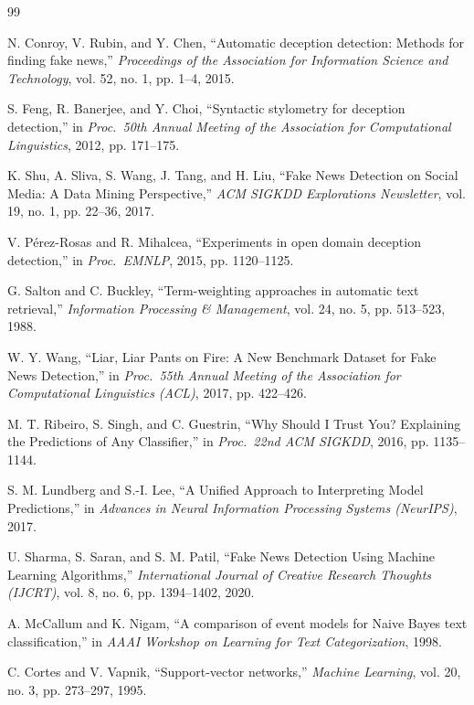 \documentclass[conference]{IEEEtran}
\begin{document}
\begin{thebibliography}{99}

 N. Conroy, V. Rubin, and Y. Chen, ``Automatic deception detection: Methods for finding fake news,'' \emph{Proceedings of the Association for Information Science and Technology}, vol. 52, no. 1, pp. 1--4, 2015.

 S. Feng, R. Banerjee, and Y. Choi, ``Syntactic stylometry for deception detection,'' in \emph{Proc.\ 50th Annual Meeting of the Association for Computational Linguistics}, 2012, pp. 171--175.

 K. Shu, A. Sliva, S. Wang, J. Tang, and H. Liu, ``Fake News Detection on Social Media: A Data Mining Perspective,'' \emph{ACM SIGKDD Explorations Newsletter}, vol. 19, no. 1, pp. 22--36, 2017.

 V. P\'erez-Rosas and R. Mihalcea, ``Experiments in open domain deception detection,'' in \emph{Proc.\ EMNLP}, 2015, pp. 1120--1125.

 G. Salton and C. Buckley, ``Term-weighting approaches in automatic text retrieval,'' \emph{Information Processing \& Management}, vol. 24, no. 5, pp. 513--523, 1988.

 W. Y. Wang, ``Liar, Liar Pants on Fire: A New Benchmark Dataset for Fake News Detection,'' in \emph{Proc.\ 55th Annual Meeting of the Association for Computational Linguistics (ACL)}, 2017, pp. 422--426.

 M. T. Ribeiro, S. Singh, and C. Guestrin, ``Why Should I Trust You? Explaining the Predictions of Any Classifier,'' in \emph{Proc.\ 22nd ACM SIGKDD}, 2016, pp. 1135--1144.

 S. M. Lundberg and S.-I. Lee, ``A Unified Approach to Interpreting Model Predictions,'' in \emph{Advances in Neural Information Processing Systems (NeurIPS)}, 2017.

 U. Sharma, S. Saran, and S. M. Patil, ``Fake News Detection Using Machine Learning Algorithms,'' \emph{International Journal of Creative Research Thoughts (IJCRT)}, vol. 8, no. 6, pp. 1394--1402, 2020.

 A. McCallum and K. Nigam, ``A comparison of event models for Naive Bayes text classification,'' in \emph{AAAI Workshop on Learning for Text Categorization}, 1998.

 C. Cortes and V. Vapnik, ``Support-vector networks,'' \emph{Machine Learning}, vol. 20, no. 3, pp. 273--297, 1995.


\end{thebibliography}
\end{document}
